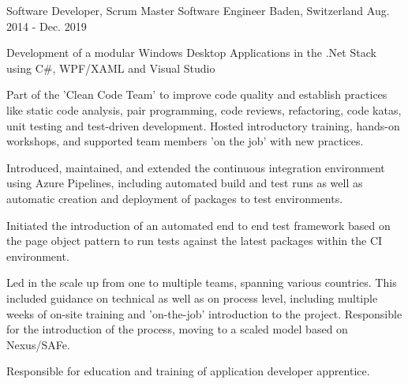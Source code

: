 \begin{cventries}
	\cventry
	{
		{		}
		{Software Developer, Scrum Master}
	} %
	{
		{Software Engineer}
	} %
	{
		{Baden, Switzerland}
	} %
	{
		{Aug. 2014 - Dec. 2019}
	} %
	{
		\begin{cvitems}
			\item {
				{Development of a modular Windows Desktop Applications in the .Net Stack using C\#, WPF/XAML and Visual Studio}
			}
			\item{
				{Part of the 'Clean Code Team' to improve code quality and establish practices like static code analysis, pair programming, code reviews, refactoring, code katas, unit testing and test-driven development. Hosted introductory training, hands-on workshops, and supported team members 'on the job' with new practices.}
			}
			\item{
				{Introduced, maintained, and extended the continuous integration environment using Azure Pipelines, including automated build and test runs as well as automatic creation and deployment of packages to test environments.}
			}
			\item{
				{Initiated the introduction of an automated end to end test framework based on the page object pattern to run tests against the latest packages within the CI environment.}
			}	
			\item{
				{Led in the scale up from one to multiple teams, spanning various countries. This included guidance on technical as well as on process level, including multiple weeks of on-site training and 'on-the-job' introduction to the project. Responsible for the introduction of the process, moving to a scaled model based on Nexus/SAFe.}
			}		
			\item {
				{Responsible for education and training of application developer apprentice.}
			}  		
		\end{cvitems}
	}
	
\end{cventries}
